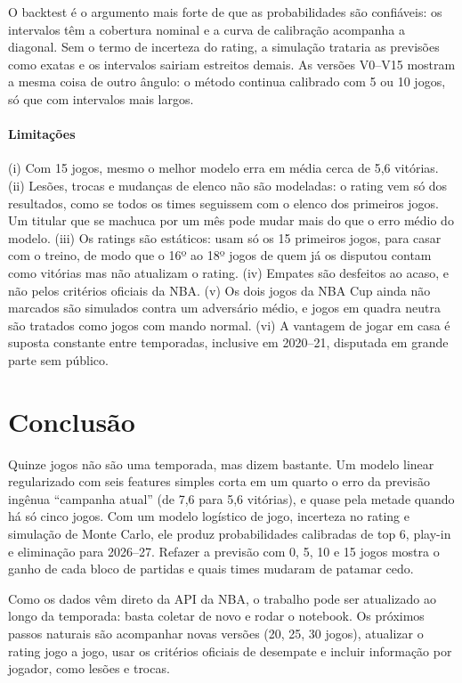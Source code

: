 \documentclass[conference]{IEEEtran}
\begin{document}
O backtest é o argumento mais forte de que as probabilidades são confiáveis: os intervalos têm a cobertura nominal e a curva de calibração acompanha a diagonal. Sem o termo de incerteza do rating, a simulação trataria as previsões como exatas e os intervalos sairiam estreitos demais. As versões V0--V15 mostram a mesma coisa de outro ângulo: o método continua calibrado com 5 ou 10 jogos, só que com intervalos mais largos.

\paragraph*{Limitações} (i) Com 15 jogos, mesmo o melhor modelo erra em média cerca de 5,6 vitórias. (ii) Lesões, trocas e mudanças de elenco não são modeladas: o rating vem só dos resultados, como se todos os times seguissem com o elenco dos primeiros jogos. Um titular que se machuca por um mês pode mudar mais do que o erro médio do modelo. (iii) Os ratings são estáticos: usam só os 15 primeiros jogos, para casar com o treino, de modo que o 16º ao 18º jogos de quem já os disputou contam como vitórias mas não atualizam o rating. (iv) Empates são desfeitos ao acaso, e não pelos critérios oficiais da NBA. (v) Os dois jogos da NBA Cup ainda não marcados são simulados contra um adversário médio, e jogos em quadra neutra são tratados como jogos com mando normal. (vi) A vantagem de jogar em casa é suposta constante entre temporadas, inclusive em 2020--21, disputada em grande parte sem público.

\section{Conclusão}
Quinze jogos não são uma temporada, mas dizem bastante. Um modelo linear regularizado com seis features simples corta em um quarto o erro da previsão ingênua ``campanha atual'' (de 7,6 para 5,6 vitórias), e quase pela metade quando há só cinco jogos. Com um modelo logístico de jogo, incerteza no rating e simulação de Monte Carlo, ele produz probabilidades calibradas de top 6, play-in e eliminação para 2026--27. Refazer a previsão com 0, 5, 10 e 15 jogos mostra o ganho de cada bloco de partidas e quais times mudaram de patamar cedo.

Como os dados vêm direto da API da NBA, o trabalho pode ser atualizado ao longo da temporada: basta coletar de novo e rodar o notebook. Os próximos passos naturais são acompanhar novas versões (20, 25, 30 jogos), atualizar o rating jogo a jogo, usar os critérios oficiais de desempate e incluir informação por jogador, como lesões e trocas.
\end{document}
